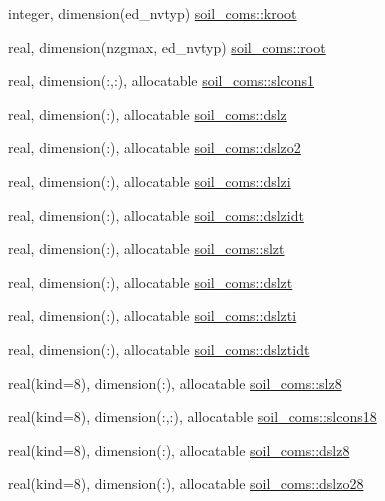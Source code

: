 \begin{DoxyCompactItemize}
integer, dimension(ed\+\_\+nvtyp) \hyperlink{namespacesoil__coms_aeec7623ed3fca9e7fce1f7f599a2b1b1}{soil\+\_\+coms\+::kroot}
\item 
real, dimension(nzgmax, ed\+\_\+nvtyp) \hyperlink{namespacesoil__coms_a22f6f63238ed3e10355d0dcc258d2441}{soil\+\_\+coms\+::root}
\item 
real, dimension(\+:,\+:), allocatable \hyperlink{namespacesoil__coms_a0550c5c548dbfde659a2d622a91b26f5}{soil\+\_\+coms\+::slcons1}
\item 
real, dimension(\+:), allocatable \hyperlink{namespacesoil__coms_a5e8ee111d9295bf4b74579a88285b613}{soil\+\_\+coms\+::dslz}
\item 
real, dimension(\+:), allocatable \hyperlink{namespacesoil__coms_af12370b1017ccb30ff0d20906aa4a45d}{soil\+\_\+coms\+::dslzo2}
\item 
real, dimension(\+:), allocatable \hyperlink{namespacesoil__coms_af2b544726d6dd9705d4b8c7c5714d92d}{soil\+\_\+coms\+::dslzi}
\item 
real, dimension(\+:), allocatable \hyperlink{namespacesoil__coms_a4b61cf24c813f2846a39570dd4ea05a8}{soil\+\_\+coms\+::dslzidt}
\item 
real, dimension(\+:), allocatable \hyperlink{namespacesoil__coms_a2a9957b4fa1ef14eea11a18d85ba6e3d}{soil\+\_\+coms\+::slzt}
\item 
real, dimension(\+:), allocatable \hyperlink{namespacesoil__coms_a94ad39e6d9d5ff44b58fc26edd54e28d}{soil\+\_\+coms\+::dslzt}
\item 
real, dimension(\+:), allocatable \hyperlink{namespacesoil__coms_af5edf2523e90d608f848782aad517da2}{soil\+\_\+coms\+::dslzti}
\item 
real, dimension(\+:), allocatable \hyperlink{namespacesoil__coms_a40f71a36860d25e091b99e5ecead9cbe}{soil\+\_\+coms\+::dslztidt}
\item 
real(kind=8), dimension(\+:), allocatable \hyperlink{namespacesoil__coms_ad701b5cd7609d6ffbd1b800df6a04bb5}{soil\+\_\+coms\+::slz8}
\item 
real(kind=8), dimension(\+:,\+:), allocatable \hyperlink{namespacesoil__coms_ade6e1d0e2d355c5f3a340352163128d9}{soil\+\_\+coms\+::slcons18}
\item 
real(kind=8), dimension(\+:), allocatable \hyperlink{namespacesoil__coms_ac6e349c53a31e55f1966a12b2b609523}{soil\+\_\+coms\+::dslz8}
\item 
real(kind=8), dimension(\+:), allocatable \hyperlink{namespacesoil__coms_af39809572006ef58a973b409d4dc013e}{soil\+\_\+coms\+::dslzo28}
\item 

\end{DoxyCompactItemize}
